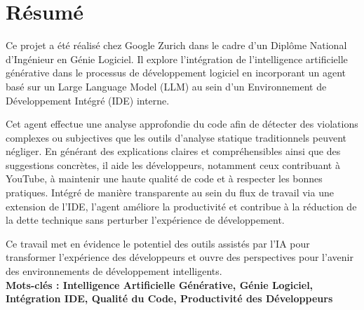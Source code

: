 \chapter*{Résumé}

Ce projet a été réalisé chez Google Zurich dans le cadre d’un Diplôme National d’Ingénieur en Génie Logiciel. Il explore l’intégration de l’intelligence artificielle générative dans le processus de développement logiciel en incorporant un agent basé sur un Large Language Model (LLM) au sein d’un Environnement de Développement Intégré (IDE) interne.

Cet agent effectue une analyse approfondie du code afin de détecter des violations complexes ou subjectives que les outils d’analyse statique traditionnels peuvent négliger. En générant des explications claires et compréhensibles ainsi que des suggestions concrètes, il aide les développeurs, notamment ceux contribuant à YouTube, à maintenir une haute qualité de code et à respecter les bonnes pratiques. Intégré de manière transparente au sein du flux de travail via une extension de l’IDE, l’agent améliore la productivité et contribue à la réduction de la dette technique sans perturber l’expérience de développement.

Ce travail met en évidence le potentiel des outils assistés par l’IA pour transformer l’expérience des développeurs et ouvre des perspectives pour l’avenir des environnements de développement intelligents.\\

\textbf{Mots-clés : Intelligence Artificielle Générative, Génie Logiciel, Intégration IDE, Qualité du Code, Productivité des Développeurs}